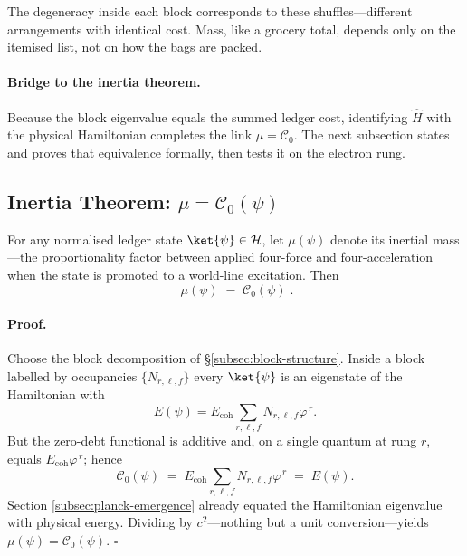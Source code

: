 \documentclass[11pt]{article}
\begin{document}
The degeneracy inside each block corresponds to these shuffles—different
arrangements with identical cost.  Mass, like a grocery total, depends
only on the itemised list, not on how the bags are packed.

\paragraph{Bridge to the inertia theorem.}
Because the block eigenvalue equals the summed ledger cost, identifying
\(\widehat{H}\) with the physical Hamiltonian completes the link
\(\mu=\mathcal{C}_{0}\).  The next subsection states and proves that
equivalence formally, then tests it on the electron rung.

\subsection{Inertia Theorem: \texorpdfstring{$\mu=\mathcal{C}_{0}(\psi)$}{μ = C₀(ψ)}}
\label{subsec:inertia-theorem}

\begin{theorem}\label{thm:inertia}
For any normalised ledger state $\ket{\psi}\in\mathcal{H}$, let
$\mu(\psi)$ denote its inertial mass—the proportionality factor between
applied four-force and four-acceleration when the state is promoted to a
world-line excitation.  Then
\[
\boxed{\;
\mu(\psi)\;=\;\mathcal{C}_{0}(\psi)\;}.
\]
\end{theorem}

\paragraph{Proof.}
Choose the block decomposition of \S\ref{subsec:block-structure}.  
Inside a block labelled by occupancies $\{N_{r,\ell,f}\}$ every
$\ket{\psi}$ is an eigenstate of the Hamiltonian with
\[
E(\psi)=E_{\text{coh}}
        \sum_{r,\ell,f} N_{r,\ell,f}\varphi^{\,r}.
\]
But the zero-debt functional is additive and, on a single quantum at
rung $r$, equals $E_{\text{coh}}\varphi^{\,r}$; hence
\[
\mathcal{C}_{0}(\psi)\;=\;
E_{\text{coh}}
\sum_{r,\ell,f} N_{r,\ell,f}\varphi^{\,r}
\;=\;
E(\psi).
\]
Section \ref{subsec:planck-emergence} already equated the Hamiltonian
eigenvalue with physical energy.  Dividing by $c^{2}$—nothing but a
unit conversion—yields $\mu(\psi)=\mathcal{C}_{0}(\psi)$.  $\square$
\end{document}
